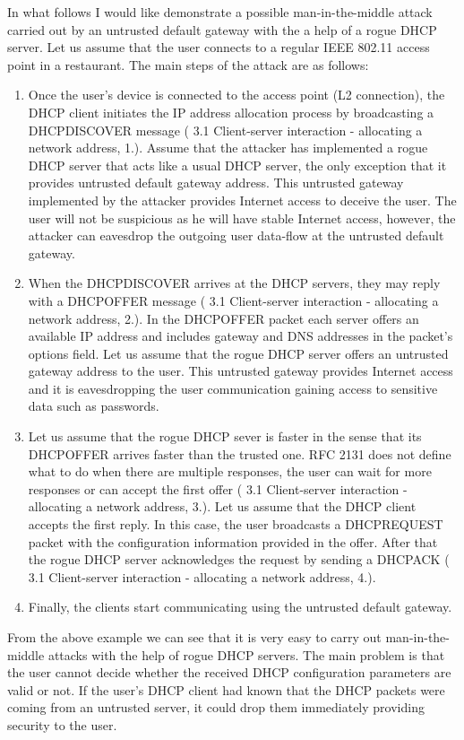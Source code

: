 \documentclass[letterpaper, 10 pt, conference]{ieeeconf}  %
\begin{document}
In what follows I would like demonstrate a possible man-in-the-middle attack carried out by an untrusted default gateway with the a help of a rogue DHCP server. Let us assume that the user connects to a regular IEEE 802.11 access point in a restaurant. The main steps of the attack are as follows:
\begin{enumerate}
\item Once the user's device is connected to the access point (L2 connection), the DHCP client initiates the IP address allocation process by broadcasting a DHCPDISCOVER message (\cite{dhcprfc} 3.1 Client-server interaction - allocating a network address, 1.). Assume that the attacker has implemented a rogue DHCP server that acts like a usual DHCP server, the only exception that it provides untrusted default gateway address. This untrusted gateway implemented by the attacker provides Internet access to deceive the user. The user will not be suspicious as he will have stable Internet access, however, the attacker can eavesdrop the outgoing user data-flow at the untrusted default gateway.
\item When the DHCPDISCOVER arrives at the DHCP servers, they may reply with a DHCPOFFER message (\cite{dhcprfc} 3.1 Client-server interaction - allocating a network address, 2.). In the DHCPOFFER packet each server offers an available IP address and includes gateway and DNS addresses in the packet's options field. Let us assume that the rogue DHCP server offers an untrusted gateway address to the user. This untrusted gateway provides Internet access and it is eavesdropping the user communication gaining access to sensitive data such as passwords.
\item Let us assume that the rogue DHCP sever is faster in the sense that its DHCPOFFER arrives faster than the trusted one. RFC 2131 does not define what to do when there are multiple responses, the user can wait for more responses or can accept the first offer (\cite{dhcprfc} 3.1 Client-server interaction - allocating a network address, 3.). Let us assume that the DHCP client accepts the first reply. In this case, the user broadcasts a DHCPREQUEST packet with the configuration information provided in the offer. After that the rogue DHCP server acknowledges the request by sending a DHCPACK (\cite{dhcprfc} 3.1 Client-server interaction - allocating a network address, 4.).
\item Finally, the clients start communicating using the untrusted default gateway.
\end{enumerate}
From the above example we can see that it is very easy to carry out man-in-the-middle attacks with the help of rogue DHCP servers. The main problem is that the user cannot decide whether the received DHCP configuration parameters are valid or not. If the user's DHCP client had known that the DHCP packets were coming from an untrusted server, it could drop them immediately providing security to the user.
\end{document}
